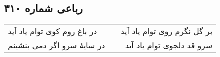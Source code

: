 \begin{center}
\section*{رباعی شماره ۳۱۰}
\label{sec:sh310}
\begin{longtable}{l p{0.5cm} r}
در باغ روم کوی توام یاد آید
&&
بر گل نگرم روی توام یاد آید
\\
در سایهٔ سرو اگر دمی بنشینم
&&
سرو قد دلجوی توام یاد آید
\\
\end{longtable}
\end{center}
